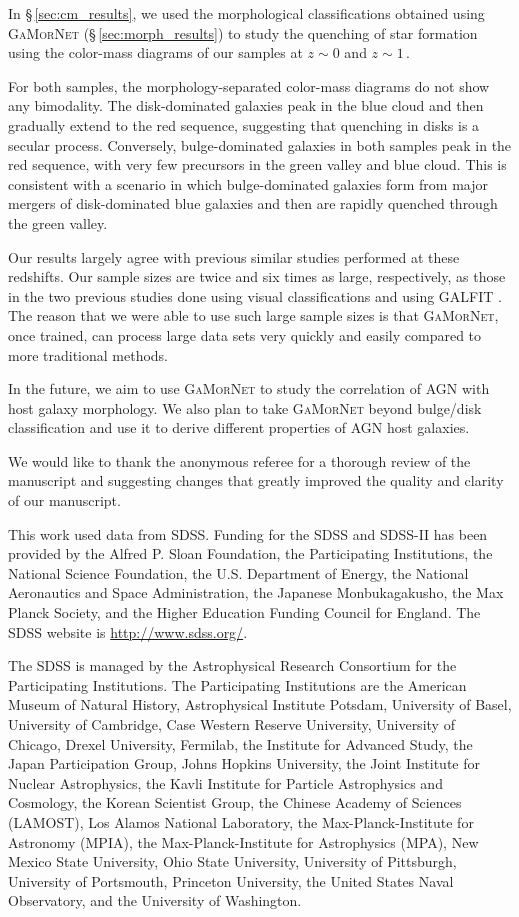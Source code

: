 \documentclass[twocolumn]{aastex63}
\newcommand\gamornet{G\textsc{a}M\textsc{or}N\textsc{et}}
\begin{document}
In \S\,\ref{sec:cm_results}, we used the morphological classifications obtained using \gamornet{} (\S\,\ref{sec:morph_results}) to study the quenching of star formation using the color-mass diagrams of our samples at $z\sim0$ and $z\sim1$\,.

For both samples, the morphology-separated color-mass diagrams do not show any bimodality. The disk-dominated galaxies peak in the blue cloud and then gradually extend to the red sequence, suggesting that quenching in disks is a secular process. Conversely, bulge-dominated galaxies in both samples peak  in  the  red  sequence,  with  very few precursors in the green valley and blue cloud. This is consistent with a scenario in which bulge-dominated galaxies form from major mergers of disk-dominated blue galaxies and then are rapidly quenched through the green valley.

Our results largely agree with previous similar studies performed at these redshifts. Our sample sizes are twice and six times as large, respectively, as those in the two previous studies done using visual classifications \citep{schawinski_14_green_herring} and using GALFIT \citep{powell_17}. The reason that we were able to use such large sample sizes is that \gamornet{}, once trained, can process large data sets very quickly and easily compared to more traditional methods.

In the future, we aim to use \gamornet{} to study the correlation of AGN with host galaxy morphology. We also plan to take \gamornet{} beyond bulge/disk classification and use it to derive different properties of AGN host galaxies. 

\acknowledgments
We would like to thank the anonymous referee for a thorough review of the manuscript and suggesting changes that greatly improved the quality and clarity of our manuscript.

This work used data from SDSS. Funding for the SDSS and SDSS-II has been provided by the Alfred P. Sloan Foundation, the Participating Institutions, the National Science Foundation, the U.S. Department of Energy, the National Aeronautics and Space Administration, the Japanese Monbukagakusho, the Max Planck Society, and the Higher Education Funding Council for England. The SDSS website is \href{http://www.sdss.org/}{http://www.sdss.org/}.

The SDSS is managed by the Astrophysical Research Consortium for the Participating Institutions. The Participating Institutions are the American Museum of Natural History, Astrophysical Institute Potsdam, University of Basel, University of Cambridge, Case Western Reserve University, University of Chicago, Drexel University, Fermilab, the Institute for Advanced Study, the Japan Participation Group, Johns Hopkins University, the Joint Institute for Nuclear Astrophysics, the Kavli Institute for Particle Astrophysics and Cosmology, the Korean Scientist Group, the Chinese Academy of Sciences (LAMOST), Los Alamos National Laboratory, the Max-Planck-Institute for Astronomy (MPIA), the Max-Planck-Institute for Astrophysics (MPA), New Mexico State University, Ohio State University, University of Pittsburgh, University of Portsmouth, Princeton University, the United States Naval Observatory, and the University of Washington.
\end{document}
